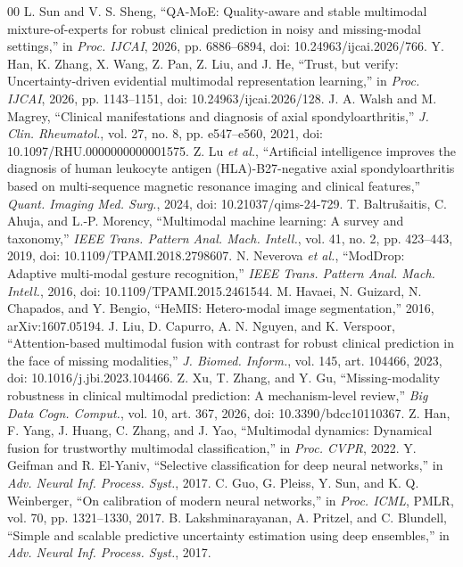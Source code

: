 \documentclass[conference]{IEEEtran}
\begin{document}
\begin{thebibliography}{00}
 L. Sun and V. S. Sheng, ``QA-MoE: Quality-aware and stable multimodal mixture-of-experts for robust clinical prediction in noisy and missing-modal settings,'' in \emph{Proc. IJCAI}, 2026, pp. 6886--6894, doi: 10.24963/ijcai.2026/766.
 Y. Han, K. Zhang, X. Wang, Z. Pan, Z. Liu, and J. He, ``Trust, but verify: Uncertainty-driven evidential multimodal representation learning,'' in \emph{Proc. IJCAI}, 2026, pp. 1143--1151, doi: 10.24963/ijcai.2026/128.
 J. A. Walsh and M. Magrey, ``Clinical manifestations and diagnosis of axial spondyloarthritis,'' \emph{J. Clin. Rheumatol.}, vol. 27, no. 8, pp. e547--e560, 2021, doi: 10.1097/RHU.0000000000001575.
 Z. Lu \emph{et al.}, ``Artificial intelligence improves the diagnosis of human leukocyte antigen (HLA)-B27-negative axial spondyloarthritis based on multi-sequence magnetic resonance imaging and clinical features,'' \emph{Quant. Imaging Med. Surg.}, 2024, doi: 10.21037/qims-24-729.
 T. Baltru\v{s}aitis, C. Ahuja, and L.-P. Morency, ``Multimodal machine learning: A survey and taxonomy,'' \emph{IEEE Trans. Pattern Anal. Mach. Intell.}, vol. 41, no. 2, pp. 423--443, 2019, doi: 10.1109/TPAMI.2018.2798607.
 N. Neverova \emph{et al.}, ``ModDrop: Adaptive multi-modal gesture recognition,'' \emph{IEEE Trans. Pattern Anal. Mach. Intell.}, 2016, doi: 10.1109/TPAMI.2015.2461544.
 M. Havaei, N. Guizard, N. Chapados, and Y. Bengio, ``HeMIS: Hetero-modal image segmentation,'' 2016, arXiv:1607.05194.
 J. Liu, D. Capurro, A. N. Nguyen, and K. Verspoor, ``Attention-based multimodal fusion with contrast for robust clinical prediction in the face of missing modalities,'' \emph{J. Biomed. Inform.}, vol. 145, art. 104466, 2023, doi: 10.1016/j.jbi.2023.104466.
 Z. Xu, T. Zhang, and Y. Gu, ``Missing-modality robustness in clinical multimodal prediction: A mechanism-level review,'' \emph{Big Data Cogn. Comput.}, vol. 10, art. 367, 2026, doi: 10.3390/bdcc10110367.
 Z. Han, F. Yang, J. Huang, C. Zhang, and J. Yao, ``Multimodal dynamics: Dynamical fusion for trustworthy multimodal classification,'' in \emph{Proc. CVPR}, 2022.
 Y. Geifman and R. El-Yaniv, ``Selective classification for deep neural networks,'' in \emph{Adv. Neural Inf. Process. Syst.}, 2017.
 C. Guo, G. Pleiss, Y. Sun, and K. Q. Weinberger, ``On calibration of modern neural networks,'' in \emph{Proc. ICML}, PMLR, vol. 70, pp. 1321--1330, 2017.
 B. Lakshminarayanan, A. Pritzel, and C. Blundell, ``Simple and scalable predictive uncertainty estimation using deep ensembles,'' in \emph{Adv. Neural Inf. Process. Syst.}, 2017.

\end{thebibliography}
\end{document}
